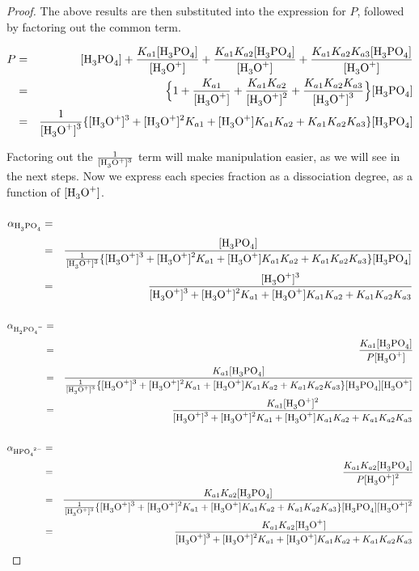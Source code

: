 \documentclass[10pt,twoside,a4paper]{article}
\begin{document}
\begin{proof}
 	The above results are then substituted into the expression for $P$, followed by factoring out the common \ce{[H_3PO_4]} term.

 	\begin{eqnarray}
 		P & = & \ce{[H_3PO_4]} + \frac{K_{a1}\ce{[H3PO4]}}{\ce{[H3O+]}} + \frac{K_{a1}K_{a2}\ce{[H3PO4]}}{\ce{[H3O+]}} + \frac{K_{a1}K_{a2}K_{a3}\ce{[H3PO4]}}{\ce{[H3O+]}}  \nonumber \\
 		& = & \Big\{ 1 + \frac{K_{a1}}{\ce{[H3O+]}} + \frac{K_{a1}K_{a2}}{\ce{[H3O+]^2}} + \frac{K_{a1}K_{a2}K_{a3}}{\ce{[H3O+]^3}} \Big\}\ce{[H3PO4]} \nonumber \\
 		& = & \frac{1}{\ce{[H3O+]^3}} \{ \ce{[H3O+]^3} + \ce{[H3O+]^2}K_{a1} + \ce{[H3O+]}K_{a1}K_{a2} + K_{a1}K_{a2}K_{a3}\}\ce{[H3PO4]} \nonumber
 		\end{eqnarray}


	Factoring out the $\frac{1}{\ce{[H3O+]^3}}$ term will make manipulation easier, as we will see in the next steps. Now we express each species fraction as a dissociation degree, as a function of $\ce{[H3O+]}$.

 	\begin{eqnarray}
 		\alpha_{\ce{H3PO4}} & = & \frac{\ce{[H3PO4]}}{P} \hspace{-10cm} \nonumber \\
 		& = & \frac{\ce{[H3PO4]}}{\frac{1}{\ce{[H3O+]^3}} \{ \ce{[H3O+]^3} + \ce{[H3O+]^2}K_{a1} + \ce{[H3O+]}K_{a1}K_{a2} + K_{a1}K_{a2}K_{a3}\}\ce{[H3PO4]}} \nonumber \\
 		& = & \frac{\ce{[H3O+]^3}}{\ce{[H3O+]^3} + \ce{[H3O+]^2}K_{a1} + \ce{[H3O+]}K_{a1}K_{a2} + K_{a1}K_{a2}K_{a3}}
 		\end{eqnarray}

 	\begin{eqnarray}
 		\alpha_{\ce{H2PO4^{-}}} & = & \frac{\ce{[H2PO4^{-}]}}{P} \hspace{-10cm} \nonumber  \\
 		& = & \frac{K_{a1}\ce{[H3PO4]}}{P\ce{[H3O+]}} \nonumber \\
 		& = & \frac{K_{a1}\ce{[H3PO4]}}{\frac{1}{\ce{[H3O+]^3}} \{ \ce{[H3O+]^3} + \ce{[H3O+]^2}K_{a1} + \ce{[H3O+]}K_{a1}K_{a2} + K_{a1}K_{a2}K_{a3}\}\ce{[H3PO4][H3O+]}} \nonumber \\
 		& = & \frac{K_{a1}\ce{[H3O+]^2}}{\ce{[H3O+]^3} + \ce{[H3O+]^2}K_{a1} + \ce{[H3O+]}K_{a1}K_{a2} + K_{a1}K_{a2}K_{a3}}
 		\end{eqnarray}

 	\begin{eqnarray}
 		\alpha_{\ce{HPO4^{2-}}} & = & \frac{\ce{[HPO4^{2-}]}}{P} \hspace{-10cm} \nonumber  \\
 		& = & \frac{K_{a1}K_{a2}\ce{[H3PO4]}}{P\ce{[H3O+]^2}} \nonumber \\
 		& = & \frac{K_{a1}K_{a2}\ce{[H3PO4]}}{\frac{1}{\ce{[H3O+]^3}} \{ \ce{[H3O+]^3} + \ce{[H3O+]^2}K_{a1} + \ce{[H3O+]}K_{a1}K_{a2} + K_{a1}K_{a2}K_{a3}\}\ce{[H3PO4][H3O+]^2}} \nonumber \\
 		& = & \frac{K_{a1}K_{a2}\ce{[H3O+]}}{\ce{[H3O+]^3} + \ce{[H3O+]^2}K_{a1} + \ce{[H3O+]}K_{a1}K_{a2} + K_{a1}K_{a2}K_{a3}}
 		\end{eqnarray}


\end{proof}
\end{document}
